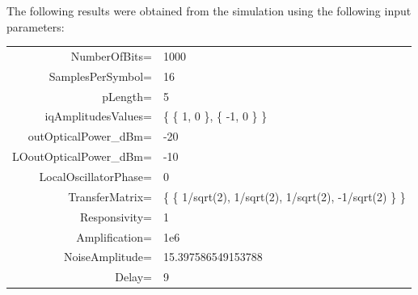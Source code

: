 \documentclass[a4paper]{article}
\begin{document}
The following results were obtained from the simulation using the following input parameters:
\begin{table}[H]
\centering
\begin{tabular}{rl}
NumberOfBits=           & 1000                                                     \\
SamplesPerSymbol=       & 16                                                       \\
pLength=                & 5                                                        \\
iqAmplitudesValues=     & \{ \{ 1, 0 \}, \{ -1, 0 \} \}                            \\
outOpticalPower\_dBm=   & -20                                                      \\
LOoutOpticalPower\_dBm= & -10                                                      \\
LocalOscillatorPhase=   & 0                                                        \\
TransferMatrix=         & \{ \{ 1/sqrt(2), 1/sqrt(2), 1/sqrt(2), -1/sqrt(2) \} \}  \\
Responsivity=           & 1                                                        \\
Amplification=          & 1e6                                                      \\
NoiseAmplitude=         & 15.397586549153788                                       \\
Delay=                  & 9                                                        \\
\end{tabular}
\end{table}
\end{document}
